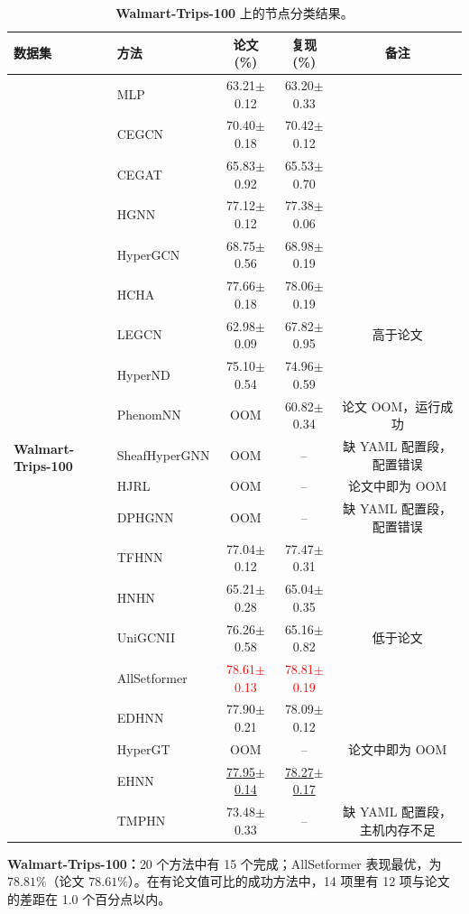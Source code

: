\documentclass[11pt,a4paper]{article}
\begin{document}
\begin{table}[H]
	\centering\small
	\begin{tabular}{llccc}
		\toprule
		数据集 & 方法 & 论文 (\%) & 复现 (\%) & 备注 \\
		\midrule
		\multirow{20}{*}{\textbf{Walmart-Trips-100}} & MLP               & 63.21$\pm$0.12   & 63.20$\pm$0.33   &  \\
		 & CEGCN             & 70.40$\pm$0.18   & 70.42$\pm$0.12   &  \\
		 & CEGAT             & 65.83$\pm$0.92   & 65.53$\pm$0.70   &  \\
		 & HGNN              & 77.12$\pm$0.12   & 77.38$\pm$0.06   &  \\
		 & HyperGCN          & 68.75$\pm$0.56   & 68.98$\pm$0.19   &  \\
		 & HCHA              & 77.66$\pm$0.18   & 78.06$\pm$0.19   &  \\
		 & LEGCN             & 62.98$\pm$0.09   & 67.82$\pm$0.95   & 高于论文 \\
		 & HyperND           & 75.10$\pm$0.54   & 74.96$\pm$0.59   &  \\
		 & PhenomNN          & OOM              & 60.82$\pm$0.34   & 论文 OOM，运行成功 \\
		 & SheafHyperGNN     & OOM              & --               & 缺 YAML 配置段，配置错误 \\
		 & HJRL              & OOM              & --               & 论文中即为 OOM \\
		 & DPHGNN            & OOM              & --               & 缺 YAML 配置段，配置错误 \\
		 & TFHNN             & 77.04$\pm$0.12   & 77.47$\pm$0.31   &  \\
		 & HNHN              & 65.21$\pm$0.28   & 65.04$\pm$0.35   &  \\
		 & UniGCNII          & 76.26$\pm$0.58   & 65.16$\pm$0.82   & 低于论文 \\
		 & AllSetformer      & \textcolor{red}{78.61$\pm$0.13}   & \textcolor{red}{78.81$\pm$0.19}   &  \\
		 & EDHNN             & 77.90$\pm$0.21   & 78.09$\pm$0.12   &  \\
		 & HyperGT           & OOM              & --               & 论文中即为 OOM \\
		 & EHNN              & \underline{77.95$\pm$0.14}   & \underline{78.27$\pm$0.17}   &  \\
		 & TMPHN             & 73.48$\pm$0.33   & --               & 缺 YAML 配置段，主机内存不足 \\
		\bottomrule
	\end{tabular}
	\caption{\textbf{Walmart-Trips-100} 上的节点分类结果。}
\end{table}
\par\smallskip
\noindent\textbf{Walmart-Trips-100：}20 个方法中有 15 个完成；AllSetformer 表现最优，为 $78.81\%$（论文 $78.61\%$）。在有论文值可比的成功方法中，14 项里有 12 项与论文的差距在 1.0 个百分点以内。
\end{document}
